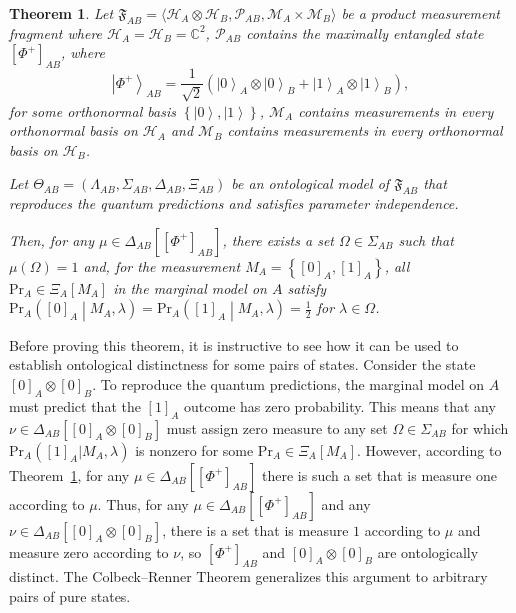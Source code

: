 \documentclass[DIV=calc,fontsize=12pt]{scrartcl} %
\theoremstyle{definition}
\theoremstyle{plain}
\newtheorem{theorem}[definition]{Theorem}
\newcommand{\Ket}[1]{\ensuremath{\left \vert #1 \right \rangle}}
\newcommand{\Proj}[1]{\ensuremath{\left [ #1 \right ]}}
\newcommand{\Hilb}[1][]{\ensuremath{\mathcal{H}_{#1}}}
\begin{document}
\begin{theorem}
\label{thm:CR:qubit}
Let $\mathfrak{F}_{AB} = \langle \Hilb[A] \otimes \Hilb[B],
\mathcal{P}_{AB}, \mathcal{M}_A \times \mathcal{M}_B \rangle$ be a
product measurement fragment where $\Hilb[A] = \Hilb[B] =
\mathbb{C}^2$, $\mathcal{P}_{AB}$ contains the maximally entangled
state $\Proj{\Phi^+}_{AB}$, where
\begin{equation}
\Ket{\Phi^+}_{AB} = \frac{1}{\sqrt{2}} \left ( \Ket{0}_A \otimes
\Ket{0}_B  + \Ket{1}_A \otimes \Ket{1}_B \right ),
\end{equation}
for some orthonormal basis $\left \{ \Ket{0}, \Ket{1} \right \}$,
$\mathcal{M}_A$ contains measurements in every orthonormal basis on
$\Hilb[A]$ and $\mathcal{M}_B$ contains measurements in every
orthonormal basis on $\Hilb[B]$.

Let $\Theta_{AB} = (\Lambda_{AB}, \Sigma_{AB}, \Delta_{AB}, \Xi_{AB})$
be an ontological model of $\mathfrak{F}_{AB}$ that reproduces the
quantum predictions and satisfies parameter independence.

Then, for any $\mu \in \Delta_{AB}\left [ \Proj{\Phi^+}_{AB} \right
]$, there exists a set $\Omega \in \Sigma_{AB}$ such that
$\mu(\Omega) = 1$ and, for the measurement $M_A = \left
\{\Proj{0}_A, \Proj{1}_A \right \}$, all $\mathrm{Pr}_A \in
\Xi_A[M_A]$ in the marginal model on $A$ satisfy $\mathrm{Pr}_A
\left ( \Proj{0}_A \middle | M_A,\lambda \right ) = \mathrm{Pr}_A
\left ( \Proj{1}_A \middle | M_A,\lambda \right ) = \frac{1}{2}$ for
$\lambda \in \Omega$.
\end{theorem}

Before proving this theorem, it is instructive to see how it can be
used to establish ontological distinctness for some pairs of states.
Consider the state $\Proj{0}_A \otimes \Proj{0}_B$.  To reproduce the
quantum predictions, the marginal model on $A$ must predict that the
$\Proj{1}_A$ outcome has zero probability.  This means that any $\nu
\in \Delta_{AB}[\Proj{0}_A \otimes \Proj{0}_B]$ must assign zero
measure to any set $\Omega \in \Sigma_{AB}$ for which
$\text{Pr}_A(\Proj{1}_A|M_A,\lambda)$ is nonzero for some $\text{Pr}_A
\in \Xi_A[M_A]$.  However, according to Theorem~\ref{thm:CR:qubit},
for any $\mu \in \Delta_{AB} \left [ \Proj{\Phi^+}_{AB} \right ]$
there is such a set that is measure one according to $\mu$.  Thus, for
any $\mu \in \Delta_{AB} \left [ \Proj{\Phi^+}_{AB} \right ]$ and any
$\nu \in \Delta_{AB} \left [ \Proj{0}_A \otimes \Proj{0}_B \right ]$,
there is a set that is measure $1$ according to $\mu$ and measure zero
according to $\nu$, so $\Proj{\Phi^+}_{AB}$ and $\Proj{0}_A \otimes
\Proj{0}_B$ are ontologically distinct.  The Colbeck--Renner Theorem
generalizes this argument to arbitrary pairs of pure states.
\end{document}
